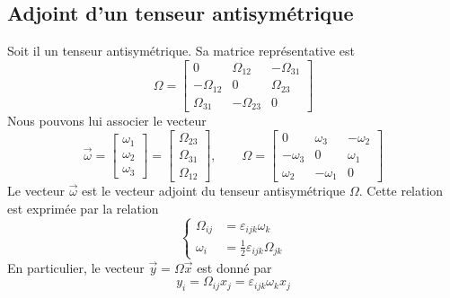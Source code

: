 \subsection{Adjoint d'un tenseur antisymétrique}
Soit il un tenseur antisymétrique.
Sa matrice représentative est
\begin{equation}
    \mathbb{\Omega} = 
    \begin{bmatrix}
        0 & \Omega_{12} & -\Omega_{31} \\
        -\Omega_{12} & 0 & \Omega_{23} \\
        \Omega_{31} & -\Omega_{23} & 0
    \end{bmatrix}
    \label{eq:AnnA-046}
\end{equation}
Nous pouvons lui associer le vecteur
\begin{equation}
    \vec{\omega} = 
    \begin{bmatrix}
        \omega_1 \\
        \omega_2 \\
        \omega_3
    \end{bmatrix} =
    \begin{bmatrix}
        \Omega_{23} \\
        \Omega_{31} \\
        \Omega_{12}
    \end{bmatrix}, \qquad
    \mathbb{\Omega} = 
    \begin{bmatrix}
        0 & \omega_3 &-\omega_2 \\
        -\omega_3 & 0 & \omega_1 \\
        \omega_2 & -\omega_1 & 0
    \end{bmatrix}
    \label{eq:AnnA-047}
\end{equation}
Le vecteur $\vec{\omega}$ est le vecteur adjoint du tenseur antisymétrique $\mathbb{\Omega}$.
Cette relation est exprimée par la relation
\begin{equation}
    \left\{
    \begin{aligned}
        \Omega_{ij} &= \varepsilon_{ijk} \omega_{k} \\
        \omega_i &= \frac{1}{2} \varepsilon_{ijk} \Omega_{jk}
    \end{aligned}
    \right.
    \label{eq:AnnA-048}
\end{equation}
En particulier, le vecteur $\vec{y} = \mathbb{\Omega} \vec{x}$ est donné par
\begin{equation}
    y_i = \Omega_{ij} x_j = \varepsilon_{ijk} \omega_k x_j
    \label{eq:AnnA-049}
\end{equation}
